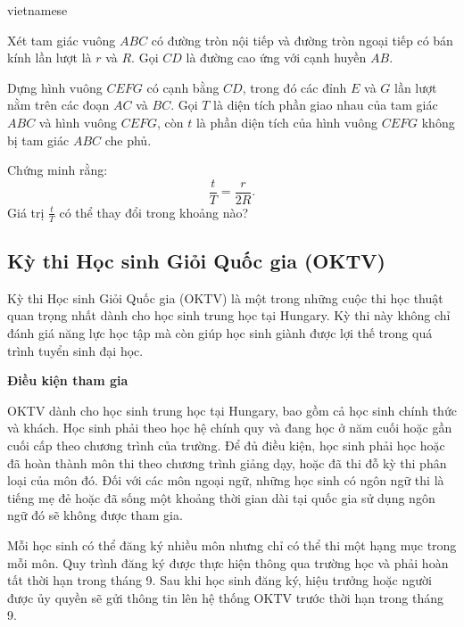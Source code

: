 \documentclass{article}
\begin{document}
\begin{otherlanguage*}{vietnamese}
\begin{problem*}
    Xét tam giác vuông \( ABC \) có đường tròn nội tiếp và đường tròn ngoại tiếp có bán kính lần lượt là \( r \) và \( R \). Gọi \( CD \) là đường cao ứng với cạnh huyền \( AB \).  
    
    Dựng hình vuông \( CEFG \) có cạnh bằng \( CD \), trong đó các đỉnh \( E \) và \( G \) lần lượt nằm trên các đoạn \( AC \) và \( BC \).
    Gọi \( T \) là diện tích phần giao nhau của tam giác \( ABC \) và hình vuông \( CEFG \), còn \( t \) là phần diện tích của hình vuông \( CEFG \) không bị tam giác \( ABC \) che phủ.  
    \begin{enumerate}[topsep=0pt, partopsep=0pt, itemsep=0pt]
        \ii Chứng minh rằng:
        \[
            \frac{t}{T} = \frac{r}{2R}.
        \]
        \ii Giá trị \( \frac{t}{T} \) có thể thay đổi trong khoảng nào?
    \end{enumerate}
\end{problem*}

\newpage

\subsection{Kỳ thi Học sinh Giỏi Quốc gia (OKTV)}

Kỳ thi Học sinh Giỏi Quốc gia (OKTV) là một trong những cuộc thi học thuật quan trọng nhất dành cho học sinh trung học tại Hungary.
Kỳ thi này không chỉ đánh giá năng lực học tập mà còn giúp học sinh giành được lợi thế trong quá trình tuyển sinh đại học.

\textbf{Điều kiện tham gia}

OKTV dành cho học sinh trung học tại Hungary, bao gồm cả học sinh chính thức và khách. Học sinh phải theo học hệ chính quy và đang học ở năm cuối hoặc gần cuối cấp theo chương trình của trường.
Để đủ điều kiện, học sinh phải học hoặc đã hoàn thành môn thi theo chương trình giảng dạy, hoặc đã thi đỗ kỳ thi phân loại của môn đó.
Đối với các môn ngoại ngữ, những học sinh có ngôn ngữ thi là tiếng mẹ đẻ hoặc đã sống một khoảng thời gian dài tại quốc gia sử dụng ngôn ngữ đó sẽ không được tham gia.

Mỗi học sinh có thể đăng ký nhiều môn nhưng chỉ có thể thi một hạng mục trong mỗi môn. Quy trình đăng ký được thực hiện thông qua trường học và phải hoàn tất thời hạn trong tháng 9.
Sau khi học sinh đăng ký, hiệu trưởng hoặc người được ủy quyền sẽ gửi thông tin lên hệ thống OKTV trước thời hạn trong tháng 9.


\end{otherlanguage*}
\end{document}
